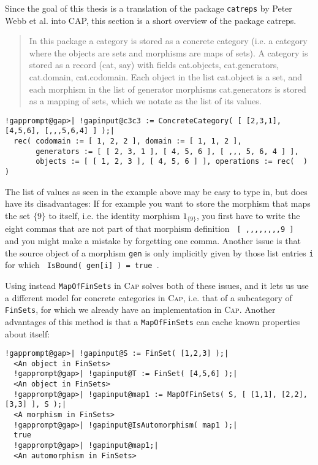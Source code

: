 Since the goal of this thesis is a translation of the package \texttt{catreps} by Peter Webb et al. into CAP, this section is
a short overview of the package catreps.

\blockquote[\cite{[Webb2020]}]{In this package a category is stored as a concrete category (i.e. a category where the objects are sets and
morphisms are maps of sets).
A category is stored as a record (cat, say) with fields cat.objects, cat.generators, cat.domain, cat.codomain.
Each object in the list cat.object is a set, and each morphism in the list of generator morphisms cat.generators
is stored as a mapping of sets, which we notate as the list of its values.}

\begin{Verbatim}[commandchars=!@|,fontsize=\small,frame=single,label=Example]
  !gapprompt@gap>| !gapinput@c3c3 := ConcreteCategory( [ [2,3,1], [4,5,6], [,,,5,6,4] ] );|
  rec( codomain := [ 1, 2, 2 ], domain := [ 1, 1, 2 ],
       generators := [ [ 2, 3, 1 ], [ 4, 5, 6 ], [ ,,, 5, 6, 4 ] ],
       objects := [ [ 1, 2, 3 ], [ 4, 5, 6 ] ], operations := rec(  ) )
\end{Verbatim}

\noindent The list of values as seen in the example above may be easy to type in, but does have its disadvantages: If for example you want to store the
morphism that maps the set $\{9\}$ to itself, i.e. the identity morphism $1_{\{9\}}$, you first have to write the eight commas that are not part of that
morphism definition \texttt{ [ ,,,,,,,,9 ] } and you might make a mistake by forgetting one comma.
Another issue is that the source object of a morphism \texttt{gen} is only implicitly given by those list entries \texttt{i} for which
\texttt{ IsBound( gen[i] ) = true }.

Using instead \texttt{MapOfFinSets} in \textsc{Cap} solves both of these issues, and it lets us use a different model for concrete categories in \textsc{Cap},
i.e. that of a subcategory of \texttt{FinSets}, for which we already have an implementation in \textsc{Cap}. 
Another advantages of this method is that a \texttt{MapOfFinSets} can cache known properties about itself:

\begin{Verbatim}[commandchars=!@|,fontsize=\small,frame=single,label=Example]
  !gapprompt@gap>| !gapinput@S := FinSet( [1,2,3] );|
  <An object in FinSets>
  !gapprompt@gap>| !gapinput@T := FinSet( [4,5,6] );|
  <An object in FinSets>
  !gapprompt@gap>| !gapinput@map1 := MapOfFinSets( S, [ [1,1], [2,2], [3,3] ], S );|
  <A morphism in FinSets>
  !gapprompt@gap>| !gapinput@IsAutomorphism( map1 );|
  true
  !gapprompt@gap>| !gapinput@map1;|
  <An automorphism in FinSets>
\end{Verbatim}


